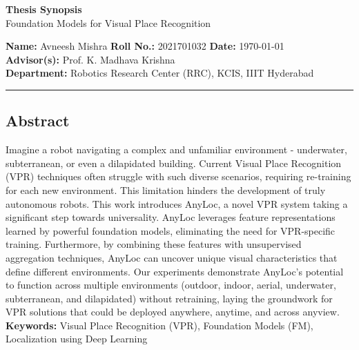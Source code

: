 \documentclass{article}
\begin{document}
    \begin{center}
        {\bfseries\Large Thesis Synopsis} \\ [2.5mm]
        {\large Foundation Models for Visual Place Recognition}
    \end{center}
    {\bf Name:} Avneesh Mishra
    \hfill {\bf Roll No.:} 2021701032
    \hfill {\bf Date:} \today \\ [2mm]
    {\bf Advisor(s):} Prof. K. Madhava Krishna \\ [2mm]
    {\bf Department:} Robotics Research Center (RRC), KCIS, IIIT 
        Hyderabad
    \vspace{2mm}
    \hrule
    \begin{center}
    \subsection*{\centering Abstract}
    \begin{minipage}{0.85\textwidth}
        Imagine a robot navigating a complex and unfamiliar
        environment - underwater, subterranean, or even a dilapidated
        building. Current Visual Place Recognition (VPR) techniques
        often struggle with such diverse scenarios, requiring
        re-training for each new environment. This limitation hinders
        the development of truly autonomous robots. This work
        introduces AnyLoc, a novel VPR system taking a significant
        step towards universality. AnyLoc leverages feature
        representations learned by powerful foundation models,
        eliminating the need for VPR-specific training. Furthermore,
        by combining these features with unsupervised aggregation
        techniques, AnyLoc can uncover unique visual characteristics
        that define different environments. Our experiments
        demonstrate AnyLoc’s potential to function across multiple
        environments (outdoor, indoor, aerial, underwater,
        subterranean, and dilapidated) without retraining, laying the
        groundwork for VPR solutions that could be deployed anywhere,
        anytime, and across anyview. \\ [2mm]
        {\bf Keywords:} Visual Place Recognition (VPR), Foundation 
        Models (FM), Localization using Deep Learning
    \end{minipage} \\ [2mm]
    \end{center}
\end{document}
